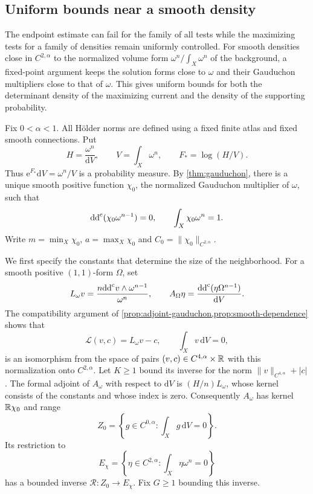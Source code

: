 \subsection{Uniform bounds near a smooth density}
\label{sec:gaud-local-adjoint-bounds}

The endpoint estimate can fail for the family of all tests while the maximizing tests for a family of densities remain uniformly controlled. For smooth densities close in $C^{2,\alpha}$ to the normalized volume form $\omega^n/\int_X\omega^n$ of the background, a fixed-point argument keeps the solution forms close to $\omega$ and their Gauduchon multipliers close to that of $\omega$. This gives uniform bounds for both the determinant density of the maximizing current and the density of the supporting probability.

Fix $0<\alpha<1$. All H\"older norms are defined using a fixed finite atlas and fixed smooth connections. Put
\[
 H=\frac{\omega^n}{\mathrm{d}V},\qquad
 V=\int_X\omega^n,\qquad F_*=\log(H/V).
\]
Thus $\mathrm{e}^{F_*}\mathrm{d}V=\omega^n/V$ is a probability measure. By \cref{thm:gauduchon}, there is a unique smooth positive function $\chi_0$, the normalized Gauduchon multiplier of $\omega$, such that
\[
 \mathrm{dd}^{\mathrm{c}}(\chi_0\omega^{n-1})=0,\qquad
 \int_X\chi_0\omega^n=1.
\]
Write $m=\min_X\chi_0$, $a=\max_X\chi_0$ and $C_0=\|\chi_0\|_{C^{2,\alpha}}$.

We first specify the constants that determine the size of the neighborhood. For a smooth positive $(1,1)$-form $\Omega$, set
\[
 L_\omega v=\frac{n\mathrm{dd}^{\mathrm{c}} v\wedge\omega^{n-1}}{\omega^n},
 \qquad A_\Omega\eta=\frac{\mathrm{dd}^{\mathrm{c}}(\eta\Omega^{n-1})}{\mathrm{d}V}.
\]
The compatibility argument of \cref{prop:adjoint-gauduchon,prop:smooth-dependence} shows that
\[
 \mathcal L(v,c)=L_\omega v-c,
 \qquad \int_Xv\,\mathrm{d}V=0,
\]
is an isomorphism from the space of pairs $(v,c)\in C^{4,\alpha}\times\mathbb R$ with this normalization onto $C^{2,\alpha}$. Let $K\geq1$ bound its inverse for the norm $\|v\|_{C^{4,\alpha}}+|c|$. The formal adjoint of $A_\omega$ with respect to $\mathrm{d}V$ is $(H/n)L_\omega$, whose kernel consists of the constants and whose index is zero. Consequently $A_\omega$ has kernel $\mathbb R\chi_0$ and range
\[
 Z_0=\left\{g\in C^{0,\alpha}:\int_Xg\,\mathrm{d}V=0\right\}.
\]
Its restriction to
\[
 E_\chi=\left\{\eta\in C^{2,\alpha}:\int_X\eta\omega^n=0\right\}
\]
has a bounded inverse $\mathcal R\colon Z_0\to E_\chi$. Fix $G\geq1$ bounding this inverse.

